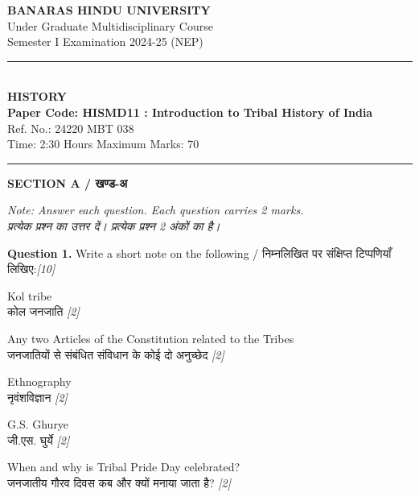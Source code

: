 \documentclass[11pt,a4paper]{article}
\newcommand{\pts}[1]{\hfill \textit{[#1]}}
\begin{document}
\begin{center}
  {\large\bfseries BANARAS HINDU UNIVERSITY}\\[2pt]
  {\normalsize Under Graduate Multidisciplinary Course}\\[2pt]
  {\normalsize Semester I Examination 2024-25 (NEP)}\\[6pt]
  \rule{0.8\linewidth}{0.5pt}\\[6pt]
  {\large\bfseries HISTORY}\\[4pt]
  {\large\bfseries Paper Code: HISMD11 : Introduction to Tribal History of India}\\[2pt]
  {\small Ref. No.: 24220 MBT 038}\\[4pt]
  {\normalsize Time: 2:30 Hours \hfill Maximum Marks: 70}
\end{center}

\rule{\linewidth}{0.4pt}

\smallskip

\begin{center}
  {\large\bfseries SECTION A / खण्ड-अ}
\end{center}

\noindent \textit{Note: Answer each question. Each question carries 2 marks.}\\[2pt]
\noindent \textit{प्रत्येक प्रश्न का उत्तर दें। प्रत्येक प्रश्न 2 अंकों का है।}

\bigskip

\noindent \textbf{Question 1.} Write a short note on the following / निम्नलिखित पर संक्षिप्त टिप्पणियाँ लिखिए:\pts{10}

\begin{parts}
  \item Kol tribe\\[1pt]
        कोल जनजाति \pts{2}

  \item Any two Articles of the Constitution related to the Tribes\\[1pt]
        जनजातियों से संबंधित संविधान के कोई दो अनुच्छेद \pts{2}

  \item Ethnography\\[1pt]
        नृवंशविज्ञान \pts{2}

  \item G.S. Ghurye\\[1pt]
        जी.एस. घुर्ये \pts{2}

  \item When and why is Tribal Pride Day celebrated?\\[1pt]
        जनजातीय गौरव दिवस कब और क्यों मनाया जाता है? \pts{2}
\end{parts}
\end{document}
